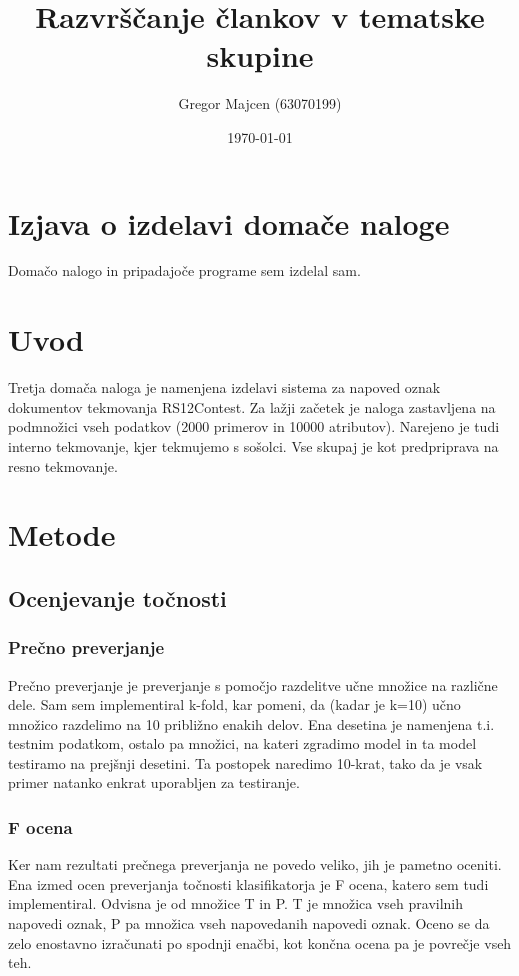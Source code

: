 \documentclass[a4paper,11pt]{article}
\title{Razvrščanje člankov v tematske skupine}
\author{Gregor Majcen (63070199)}
\date{\today}
\begin{document}
\maketitle

\section{Izjava o izdelavi domače naloge}
Domačo nalogo in pripadajoče programe sem izdelal sam.

\section{Uvod}
Tretja domača naloga je namenjena izdelavi sistema za napoved oznak dokumentov tekmovanja RS12Contest. Za lažji začetek je naloga zastavljena na podmnožici vseh podatkov (2000 primerov in 10000 atributov). Narejeno je tudi interno tekmovanje, kjer tekmujemo s sošolci. Vse skupaj je kot predpriprava na resno tekmovanje.

\section{Metode}
\subsection{Ocenjevanje točnosti}
\subsubsection{Prečno preverjanje}
Prečno preverjanje je preverjanje s pomočjo razdelitve učne množice na različne dele. Sam sem implementiral k-fold, kar pomeni, da (kadar je k=10) učno množico razdelimo na 10 približno enakih delov. Ena desetina je namenjena t.i. testnim podatkom, ostalo pa množici, na kateri zgradimo model in ta model testiramo na prejšnji desetini. Ta postopek naredimo 10-krat, tako da je vsak primer natanko enkrat uporabljen za testiranje.
\subsubsection{F ocena}
Ker nam rezultati prečnega preverjanja ne povedo veliko, jih je pametno oceniti. Ena izmed ocen preverjanja točnosti klasifikatorja je F ocena, katero sem tudi implementiral. Odvisna je od množice T in P. T je množica vseh pravilnih napovedi oznak, P pa množica vseh napovedanih napovedi oznak. Oceno se da zelo enostavno izračunati po spodnji enačbi, kot končna ocena pa je povrečje vseh teh.
\end{document}
